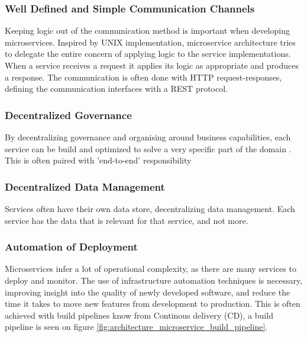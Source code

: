 \subsubsection*{Well Defined and Simple Communication Channels}
Keeping logic out of the communication method is important when developing microservices. Inspired by UNIX implementation, microservice architecture tries to delegate the entire concern of applying logic to the service implementations. When a service receives a request it applies its logic as appropriate and produces a response. The communication is often done with HTTP request-responses, defining the communication interfaces with a REST protocol\cite{fowler2014microservices}.

\subsubsection*{Decentralized Governance}
By decentralizing governance and organising around business capabilities, each service can be build and optimized to solve a very specific part of the domain \cite{fowler2014microservices}.
This is often paired with 'end-to-end' responsibility 

\subsubsection*{Decentralized Data Management}
Services often have their own data store, decentralizing data management. Each service has the data that is relevant for that service, and not more. 


\subsubsection*{Automation of Deployment}
Microservices infer a lot of operational complexity, as there are many services to deploy and monitor. The use of infrastructure automation techniques is necessary, improving insight into the quality of newly developed software, and reduce the time it takes to move new features from development to production\cite{newman2015microservices}. This is often achieved with build pipelines know from Continous delivery (CD), a build pipeline is seen on figure \ref{fig:architecture_microservice_build_pipeline}.

